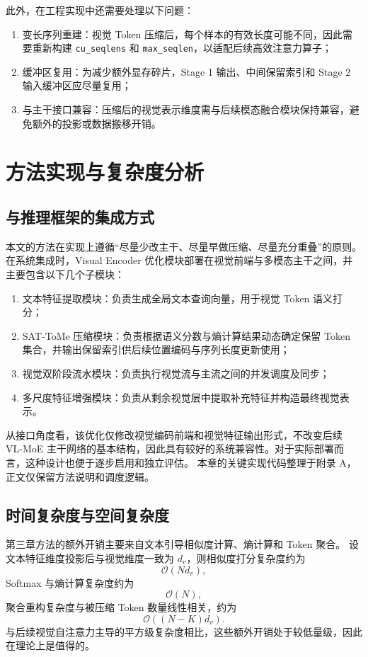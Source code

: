 此外，在工程实现中还需要处理以下问题：
\begin{enumerate}
\item 变长序列重建：视觉 Token 压缩后，每个样本的有效长度可能不同，因此需要重新构建 \texttt{cu\_seqlens} 和 \texttt{max\_seqlen}，以适配后续高效注意力算子；
\item 缓冲区复用：为减少额外显存碎片，Stage 1 输出、中间保留索引和 Stage 2 输入缓冲区应尽量复用；
\item 与主干接口兼容：压缩后的视觉表示维度需与后续模态融合模块保持兼容，避免额外的投影或数据搬移开销。
\end{enumerate}


\section{方法实现与复杂度分析}
\subsection{与推理框架的集成方式}
本文的方法在实现上遵循“尽量少改主干、尽量早做压缩、尽量充分重叠”的原则。
在系统集成时，Visual Encoder 优化模块部署在视觉前端与多模态主干之间，并主要包含以下几个子模块：
\begin{enumerate}
\item 文本特征提取模块：负责生成全局文本查询向量，用于视觉 Token 语义打分；
\item SAT-ToMe 压缩模块：负责根据语义分数与熵计算结果动态确定保留 Token 集合，并输出保留索引供后续位置编码与序列长度更新使用；
\item 视觉双阶段流水模块：负责执行视觉流与主流之间的并发调度及同步；
\item 多尺度特征增强模块：负责从剩余视觉层中提取补充特征并构造最终视觉表示。
\end{enumerate}

从接口角度看，该优化仅修改视觉编码前端和视觉特征输出形式，不改变后续 VL-MoE 主干网络的基本结构，因此具有较好的系统兼容性。对于实际部署而言，这种设计也便于逐步启用和独立评估。
本章的关键实现代码整理于附录 A，正文仅保留方法说明和调度逻辑。

\subsection{时间复杂度与空间复杂度}
第三章方法的额外开销主要来自文本引导相似度计算、熵计算和 Token 聚合。
设文本特征维度投影后与视觉维度一致为 $d_v$，则相似度打分复杂度约为
\begin{equation}
\mathcal{O}(N d_v),
\end{equation}
Softmax 与熵计算复杂度约为
\begin{equation}
\mathcal{O}(N),
\end{equation}
聚合重构复杂度与被压缩 Token 数量线性相关，约为
\begin{equation}
\mathcal{O}((N-K)d_v).
\end{equation}
与后续视觉自注意力主导的平方级复杂度相比，这些额外开销处于较低量级，因此在理论上是值得的。

